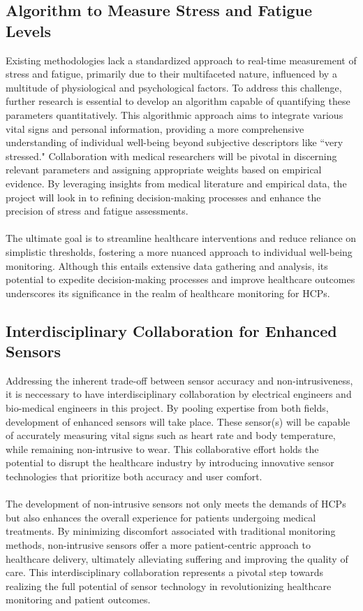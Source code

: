 \subsection{Algorithm to Measure Stress and Fatigue Levels}
Existing methodologies lack a standardized approach to real-time measurement of stress and fatigue, primarily due to their multifaceted nature, influenced by a multitude of physiological and psychological factors. To address this challenge, further research is essential to develop an algorithm capable of quantifying these parameters quantitatively. This algorithmic approach aims to integrate various vital signs and personal information, providing a more comprehensive understanding of individual well-being beyond subjective descriptors like ``very stressed." Collaboration with medical researchers will be pivotal in discerning relevant parameters and assigning appropriate weights based on empirical evidence. By leveraging insights from medical literature and empirical data, the project will look in to refining decision-making processes and enhance the precision of stress and fatigue assessments. \\ \\
The ultimate goal is to streamline healthcare interventions and reduce reliance on simplistic thresholds, fostering a more nuanced approach to individual well-being monitoring. Although this entails extensive data gathering and analysis, its potential to expedite decision-making processes and improve healthcare outcomes underscores its significance in the realm of healthcare monitoring for HCPs.

\subsection{Interdisciplinary Collaboration for Enhanced Sensors}
Addressing the inherent trade-off between sensor accuracy and non-intrusiveness, it is neccessary to have interdisciplinary collaboration by electrical engineers and bio-medical engineers in this project. By pooling expertise from both fields, development of enhanced sensors will take place. These sensor(s) will be capable of accurately measuring vital signs such as heart rate and body temperature, while remaining non-intrusive to wear. This collaborative effort holds the potential to disrupt the healthcare industry by introducing innovative sensor technologies that prioritize both accuracy and user comfort.\\ \\
The development of non-intrusive sensors not only meets the demands of HCPs but also enhances the overall experience for patients undergoing medical treatments. By minimizing discomfort associated with traditional monitoring methods, non-intrusive sensors offer a more patient-centric approach to healthcare delivery, ultimately alleviating suffering and improving the quality of care. This interdisciplinary collaboration represents a pivotal step towards realizing the full potential of sensor technology in revolutionizing healthcare monitoring and patient outcomes.

